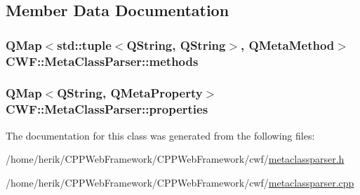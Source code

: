 \subsection{Member Data Documentation}
\hypertarget{class_c_w_f_1_1_meta_class_parser_a39c54c4665716493927f2e36be0c2cc9}{
\subsubsection[{methods}]{\setlength{\rightskip}{0pt plus 5cm}Q\+Map$<$std\+::tuple$<$Q\+String, Q\+String$>$, Q\+Meta\+Method$>$ C\+W\+F\+::\+Meta\+Class\+Parser\+::methods}}\label{class_c_w_f_1_1_meta_class_parser_a39c54c4665716493927f2e36be0c2cc9}
\hypertarget{class_c_w_f_1_1_meta_class_parser_a24721c126dfff6fba83a4d5dd088ee69}{
\subsubsection[{properties}]{\setlength{\rightskip}{0pt plus 5cm}Q\+Map$<$Q\+String, Q\+Meta\+Property$>$ C\+W\+F\+::\+Meta\+Class\+Parser\+::properties}}\label{class_c_w_f_1_1_meta_class_parser_a24721c126dfff6fba83a4d5dd088ee69}


The documentation for this class was generated from the following files\+:\begin{DoxyCompactItemize}
\item 
/home/herik/\+C\+P\+P\+Web\+Framework/\+C\+P\+P\+Web\+Framework/cwf/\hyperlink{metaclassparser_8h}{metaclassparser.\+h}\item 
/home/herik/\+C\+P\+P\+Web\+Framework/\+C\+P\+P\+Web\+Framework/cwf/\hyperlink{metaclassparser_8cpp}{metaclassparser.\+cpp}\end{DoxyCompactItemize}
